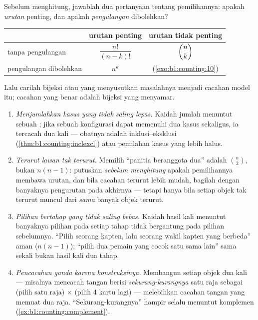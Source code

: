 \begin{method}\label{met:b1:counting:which}
Sebelum menghitung, jawablah dua pertanyaan tentang pemilihannya: apakah
\emph{urutan} penting, dan apakah \emph{pengulangan} dibolehkan?
\begin{center}
\renewcommand{\arraystretch}{1.4}
\begin{tabular}{l|c|c}
 & urutan penting & urutan tidak penting \\
\hline
tanpa pengulangan & $\dfrac{n!}{(n-k)!}$ & $\dbinom{n}{k}$ \\[6pt]
pengulangan dibolehkan & $n^k$ & (\cref{exo:b1:counting:10}) \\
\end{tabular}
\end{center}
Lalu carilah bijeksi atau  yang menyusutkan masalahnya menjadi
cacahan model itu; cacahan yang benar adalah bijeksi yang menyamar.
\end{method}

\begin{remark}\label{rem:b1:counting:pitfalls}
\begin{enumerate}
  \item \emph{Menjumlahkan kasus yang tidak saling lepas.} Kaidah jumlah
        menuntut sebuah ; jika sebuah konfigurasi dapat memenuhi
        dua kasus sekaligus, ia tercacah dua kali --- obatnya adalah
        inklusi--eksklusi (\cref{thm:b1:counting:inclexcl}) atau
        pemilahan kasus yang lebih halus.
  \item \emph{Terurut lawan tak terurut.} Memilih ``panitia beranggota
        dua'' adalah $\binom n2$, bukan $n(n-1)$: putuskan \emph{sebelum
        menghitung} apakah pemilihannya membawa urutan, dan bila
        cacahan terurut lebih mudah, bagilah dengan banyaknya
        pengurutan pada akhirnya --- tetapi hanya bila setiap objek tak
        terurut muncul dari \emph{sama} banyak objek terurut.
  \item \emph{Pilihan bertahap yang tidak saling bebas.}
        Kaidah hasil kali menuntut banyaknya pilihan pada setiap tahap
        tidak bergantung pada pilihan sebelumnya. ``Pilih seorang
        kapten, lalu seorang wakil kapten yang berbeda'' aman ($n(n-1)$);
        ``pilih dua pemain yang cocok satu sama lain'' sama sekali bukan
        hasil kali dua tahap.
  \item \emph{Pencacahan ganda karena konstruksinya.} Membangun setiap
        objek dua kali --- misalnya mencacah tangan berisi
        \emph{sekurang-kurangnya} satu raja sebagai (pilih satu raja)
        $\times$ (pilih $4$ kartu lagi) --- melebihkan cacahan tangan
        yang memuat dua raja. ``Sekurang-kurangnya'' hampir selalu
        menuntut komplemen
        (\cref{ex:b1:counting:complement}).
\end{enumerate}
\end{remark}

